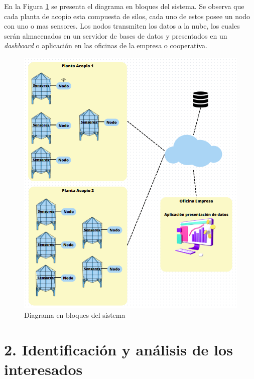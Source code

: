 \documentclass[
11pt, %
]{charter}
\begin{document}
En la Figura \ref{fig:diagBloques} se presenta el diagrama en bloques del sistema. Se observa que cada planta de acopio esta compuesta de silos, cada uno de estos posee un nodo con uno o mas sensores. Los nodos transmiten los datos a la nube, los cuales serán almacenados en un servidor de bases de datos y presentados en un \textit{dashboard} o aplicación en las oficinas de la empresa o cooperativa.

\begin{figure}[htpb]
\centering 
\includegraphics[width=.9\textwidth]{./Figuras/PlantaAcopio.png}
\caption{Diagrama en bloques del sistema}
\label{fig:diagBloques}
\end{figure}

\vspace{25px}

\section{2. Identificación y análisis de los interesados}
\label{sec:interesados}
\end{document}
